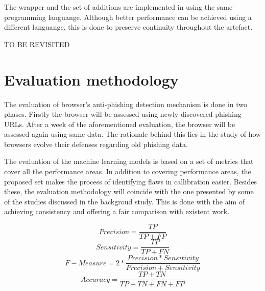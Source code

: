 The wrapper and the set of additions are implemented in using the same programming languange. Although better performance can be achieved using a different languange, this is done to preserve continuity throughout the artefact.

TO BE REVISITED

\section{Evaluation methodology}
The evaluation of browser's anti-phishing detection mechanism is done in two phases. Firstly the browser will be assessed using newly discovered phishing URLs. After a week of the aforementioned evaluation, the browser will be assessed again using same data. The rationale behind this lies in the study of how browsers evolve their defenses regarding old phishing data.

The evaluation of the machine learning models is based on a set of metrics that cover all the performance areas. In addition to covering performance areas, the proposed set makes the process of identifying flaws in callibration easier. Besides these, the evaluation methodology will coincide with the one presented by some of the studies discussed in the backgroud study. This is done with the aim of achieving consistency and offering a fair comparison with existent work.\newline


\begin{equation}
	\label{eq:PRECISION}
	Precision = \frac{TP}{TP+FP}
\end{equation}
\begin{equation}
	\label{eq:SENSITIVITY}
	Sensitivity = \frac{TP}{TP+FN}
\end{equation}
\begin{equation}
	\label{eq:FMEASURE}
	F-Measure = 2*\frac{Precision * Sensitivity}{Precision + Sensitivity}
\end{equation}
\begin{equation}
	\label{eq:ACCURACY}
	Accuracy = \frac{TP+TN}{TP+TN+FN+FP}
\end{equation}
\newline

